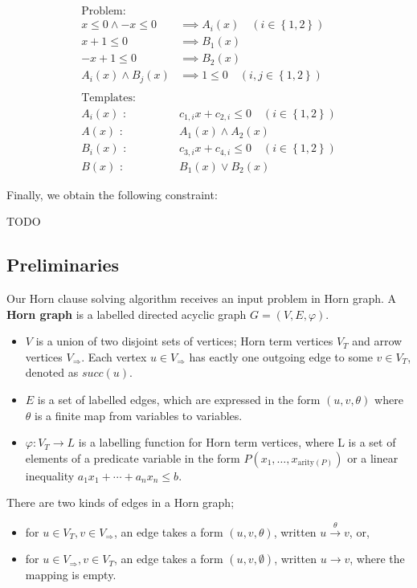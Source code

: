 \documentclass[a4paper,12pt]{article}
\newcommand{\edge}[2]{#1\rightarrow#2}
\newcommand{\edgel}[3]{#1\xrightarrow{#2}#3}
\begin{document}
\begin{align*}
\text{Problem:} \\
x \leq 0 \wedge -x \leq 0 & \implies A_i(x) \quad (i \in \left\lbrace 1,2 \right\rbrace ) \\
x+1 \leq 0 & \implies B_1(x) \\
-x+1 \leq 0 & \implies B_2(x) \\
A_i(x) \wedge B_j(x) & \implies 1 \leq 0 \quad (i,j \in \left\lbrace 1,2 \right\rbrace ) \\
\\
\text{Templates:} \\
A_i(x) \text{ : } & c_{1,i} x + c_{2,i} \leq 0 \quad (i \in \left\lbrace 1,2 \right\rbrace ) \\
A(x) \text{ : } & A_1(x) \wedge A_2(x) \\
B_i(x) \text{ : } & c_{3,i} x + c_{4,i} \leq 0 \quad (i \in \left\lbrace 1,2 \right\rbrace ) \\
B(x) \text{ : } & B_1(x) \vee B_2(x)
\end{align*}

Finally, we obtain the following constraint:

TODO

\subsection{Preliminaries}

Our Horn clause solving algorithm receives an input problem in Horn
graph. A \textbf{Horn graph} is a labelled directed acyclic graph $G=(V,E,\varphi)$.
\begin{itemize}
\item $V$ is a union of two disjoint sets of vertices; Horn term
  vertices $V_T$ and arrow vertices $V_\Rightarrow$. Each vertex $u
  \in V_\Rightarrow$ has eactly one outgoing edge to some $v \in V_T$,
  denoted as $succ(u)$.
\item $E$ is a set of labelled edges, which are expressed in the form
  $(u,v,\theta)$ where $\theta$ is a finite map from variables to
  variables.
\item $\varphi: V_T \rightarrow L$ is a labelling function for Horn
  term vertices, where L is a set of elements of a predicate variable
  in the form $P(x_1, \ldots, x_{\mathrm{arity}(P)})$ or a linear
  inequality $a_1 x_1 + \cdots + a_n x_n \leq b$.
\end{itemize}
There are two kinds of edges in a Horn graph;
\begin{itemize}
\item for $u \in V_T, v \in V_\Rightarrow$, an edge takes a form
  $(u,v,\theta)$, written $\edgel{u}{\theta}{v}$, or,
\item for $u \in V_\Rightarrow, v \in V_T$, an edge takes a form
  $(u,v,\emptyset)$, written $\edge{u}{v}$, where the mapping is
  empty.
\end{itemize}
\end{document}
